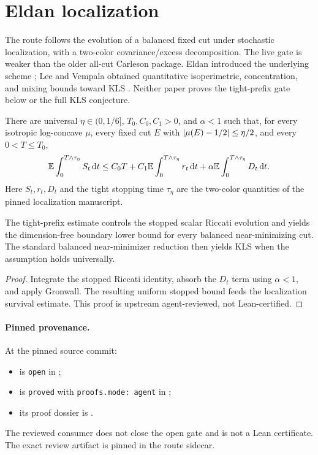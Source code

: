 \section{Eldan localization}
\label{route:eldan-localization}

The route follows the evolution of a balanced fixed cut under stochastic localization, with a
two-color covariance/excess decomposition.  The live gate is weaker than the older all-cut
Carleson package.  Eldan introduced the underlying scheme \cite{Eldan2013ThinShell}; Lee and
Vempala obtained quantitative isoperimetric, concentration, and mixing bounds toward KLS
\cite{LeeVempala2024}.  Neither paper proves the tight-prefix gate below or the full KLS
conjecture.

\begin{assumption}
  \label{ass:tight-prefix-carleson}
  There are universal $\eta\in(0,1/6]$, $T_0,C_0,C_1>0$, and $\alpha<1$ such that, for every
  isotropic log-concave $\mu$, every fixed cut $E$ with
  $\lvert\mu(E)-1/2\rvert\le\eta/2$, and every $0<T\le T_0$,
  \[
    \mathbb{E}\int_0^{T\wedge\tau_\eta}S_t\,\mathrm d t
    \le C_0T+C_1\mathbb{E}\int_0^{T\wedge\tau_\eta}r_t\,\mathrm d t
       +\alpha\mathbb{E}\int_0^{T\wedge\tau_\eta}D_t\,\mathrm d t.
  \]
  Here $S_t,r_t,D_t$ and the tight stopping time $\tau_\eta$ are the two-color quantities of the
  pinned localization manuscript.
\end{assumption}

\begin{corollary}
  \label{cor:tight-window-consumption}
  The tight-prefix estimate controls the stopped scalar Riccati evolution and yields the
  dimension-free boundary lower bound for every balanced near-minimizing cut.  The standard
  balanced near-minimizer reduction then yields KLS when the assumption holds universally.
\end{corollary}
\begin{proof}
  Integrate the stopped Riccati identity, absorb the $D_t$ term using $\alpha<1$, and apply
  Gronwall.  The resulting uniform stopped bound feeds the localization survival estimate.  This
  proof is upstream agent-reviewed, not Lean-certified.
\end{proof}

\paragraph{Pinned provenance.}
At the pinned source commit:
\begin{itemize}
  \item {} is \texttt{open} in
        ;
  \item {} is
        \texttt{proved} with \texttt{proofs.mode: agent} in
        ;
  \item its proof dossier is .
\end{itemize}
The reviewed consumer does not close the open gate and is not a Lean certificate.  The exact
review artifact is pinned in the route sidecar.

